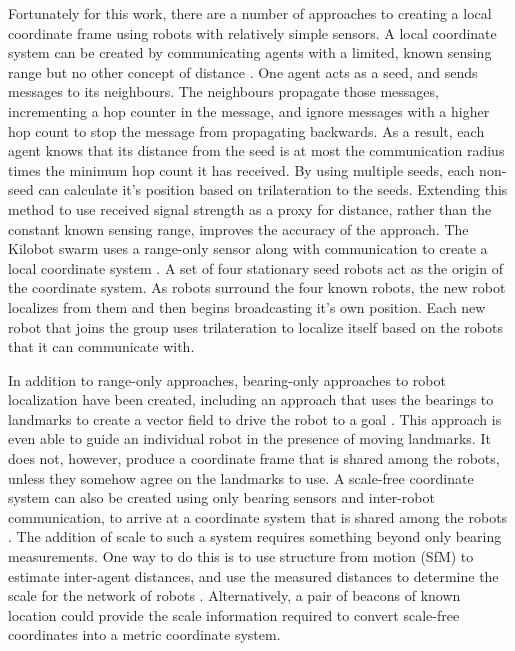 Fortunately for this work, there are a number of approaches to creating a local coordinate frame using robots with relatively simple sensors. 
A local coordinate system can be created by communicating agents with a limited, known sensing range but no other concept of distance \citep{bachrach2004experimental}.
One agent acts as a seed, and sends messages to its neighbours.
The neighbours propagate those messages, incrementing a hop counter in the message, and ignore messages with a higher hop count to stop the message from propagating backwards. 
As a result, each agent knows that its distance from the seed is at most the communication radius times the minimum hop count it has received. 
By using multiple seeds, each non-seed can calculate it's position based on trilateration to the seeds. 
Extending this method to use received signal strength as a proxy for distance, rather than the constant known sensing range, improves the accuracy of the approach.  
The Kilobot swarm uses a range-only sensor along with communication to create a local coordinate system \citep{Rubenstein795}.
A set of four stationary seed robots act as the origin of the coordinate system. As robots surround the four known robots, the new robot localizes from them and then begins broadcasting it's own position. 
Each new robot that joins the group uses trilateration to localize itself based on the robots that it can communicate with.

In addition to range-only approaches, bearing-only approaches to robot localization have been created, including an approach that uses the bearings to landmarks to create a vector field to drive the robot to a goal \citep{loizou2007biologically}. 
This approach is even able to guide an individual robot in the presence of moving landmarks. 
It does not, however, produce a coordinate frame that is shared among the robots, unless they somehow agree on the landmarks to use. 
A scale-free coordinate system can also be created using only bearing sensors and inter-robot communication, to arrive at a coordinate system that is shared among the robots \citep{cornejo2013scale}.
The addition of scale to such a system requires something beyond only bearing measurements. 
One way to do this is to use structure from motion (SfM) to estimate inter-agent distances, and use the measured distances to determine the scale for the network of robots \citep{spica2016active}. 
Alternatively, a pair of beacons of known location could provide the scale information required to convert scale-free coordinates into a metric coordinate system. 

